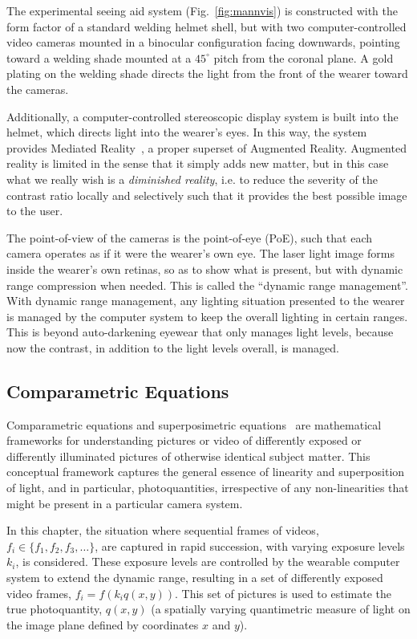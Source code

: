 The experimental seeing aid system (Fig.~\ref{fig:mannvis}) is constructed with the form factor of a 
standard welding helmet shell, but with two computer-controlled video cameras mounted in a 
binocular configuration facing downwards, pointing toward a welding shade mounted at a
$45^{\circ}$ pitch from the coronal plane.  A gold plating on the welding shade directs the light from 
the front of the wearer toward the cameras. 

Additionally, a computer-controlled stereoscopic display system is built into the helmet, which directs 
light into the wearer's eyes. In this way, the system provides Mediated 
Reality~\cite{intelligentimageprocessing}, a proper superset of Augmented Reality. Augmented reality 
is limited in the sense that it simply adds new matter, but in this case what we really wish is a {\em 
diminished reality}, i.e. to reduce the severity of the contrast ratio locally and selectively such that it 
provides the best possible image to the user. 

The point-of-view of the cameras is the point-of-eye (PoE), such that each camera operates as if it 
were the wearer's own eye. The laser light image forms inside the wearer's own retinas, so as to 
show what is present, but with dynamic range compression when needed. This is called the 
``dynamic range management''. With
dynamic range management, any lighting situation presented to the wearer is managed by the 
computer system to keep the overall lighting in certain ranges.  This is beyond auto-darkening 
eyewear that only manages light levels, because now the contrast, in addition to the light levels 
overall, is managed. 

 
\subsection{Comparametric Equations}\label{sec:comparam}
 
Comparametric equations\cite{comparam} and superposimetric equations~\cite{manders_icip2004} 
are mathematical frameworks for understanding pictures or video of differently exposed or differently
illuminated pictures of otherwise identical subject matter.  This conceptual framework captures the 
general essence of linearity and superposition of light, and in particular, photoquantities, irrespective 
of any non-linearities that might be present in a particular camera system.

In this chapter, the situation where sequential frames of videos, $f_i \in \{ f_1, f_2, f_3, \ldots \} $, are 
captured in rapid succession, with varying exposure levels $k_i$, is considered.  These exposure 
levels are controlled by the wearable computer system to extend the dynamic range, resulting in a 
set of differently exposed video
frames, $f_i = f(k_i q(x,y))$.  This set of pictures is used to estimate the true photoquantity, $q(x,y)$ 
(a spatially varying quantimetric measure of light on the image plane defined by coordinates $x$ and 
$y$).  


